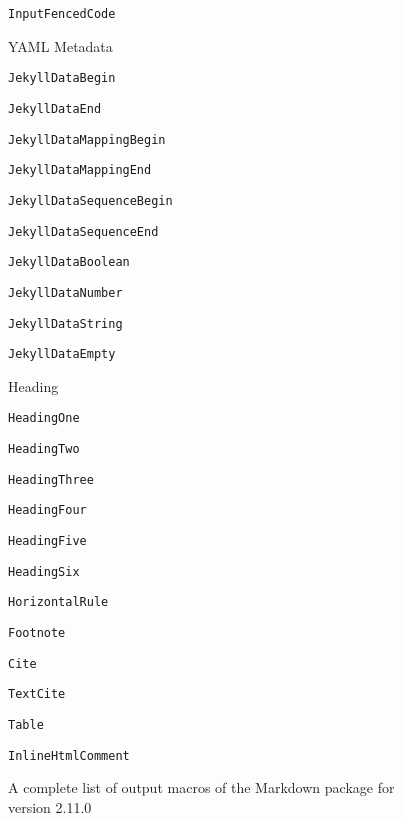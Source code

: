 \documentclass[
  digital,     %
  oneside,     %
  nosansbold,  %
  nocolorbold, %
  lof,         %
  nolot,       %
]{fithesis4}
\begin{document}
\begin{figure}
\begin{multicols}{2}
\begin{compactenum}
\begin{compactenum}
        \item \texttt{InputFencedCode}
      \end{compactenum}
      \item YAML Metadata
      \begin{compactenum}  %
        \item \texttt{JekyllDataBegin}
        \item \texttt{JekyllDataEnd}
        \item \texttt{JekyllDataMappingBegin}
        \item \texttt{JekyllDataMappingEnd}
        \item \texttt{JekyllDataSequenceBegin}
        \item \texttt{JekyllDataSequenceEnd}
        \item \texttt{JekyllDataBoolean}
        \item \texttt{JekyllDataNumber}
        \item \texttt{JekyllDataString}
        \item \texttt{JekyllDataEmpty}
      \end{compactenum}
      \item Heading
      \begin{compactenum}
        \item \texttt{HeadingOne}
        \item \texttt{HeadingTwo}
        \item \texttt{HeadingThree}
        \item \texttt{HeadingFour}
        \item \texttt{HeadingFive}
        \item \texttt{HeadingSix}
      \end{compactenum}
      \item \texttt{HorizontalRule}
      \item \texttt{Footnote}
      \item \texttt{Cite}
      \item \texttt{TextCite}
      \item \texttt{Table}
      \item \texttt{InlineHtmlComment}
    \end{compactenum}
  \end{multicols}
  \vspace*{-1em}
  \caption{A complete list of output macros of the Markdown package for version 2.11.0}
  \label{fig:markdown-renderers}
\end{figure}
\end{document}
